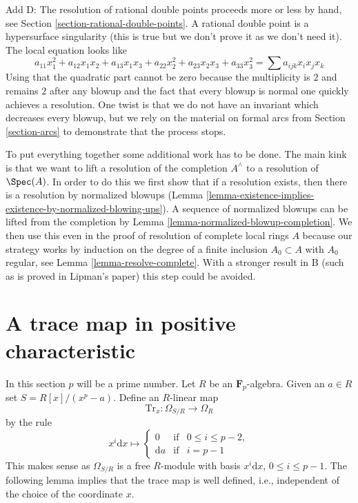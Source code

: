 \medskip\noindent
Add D: The resolution of rational double points proceeds more or
less by hand, see
Section \ref{section-rational-double-points}.
A rational double point
is a hypersurface singularity (this is true but we don't prove it
as we don't need it). The local equation looks like
$$
a_{11} x_1^2 + a_{12} x_1x_2 + a_{13}x_1x_3 + a_{22} x_2^2 +
a_{23} x_2x_3 + a_{33} x_3^2 =
\sum a_{ijk} x_ix_jx_k
$$
Using that the quadratic part cannot be zero because the multiplicity
is $2$ and remains $2$ after any blowup and the fact that every blowup
is normal one quickly achieves a resolution. One twist is that we
do not have an invariant which decreases every blowup, but we rely
on the material on formal arcs from Section \ref{section-arcs}
to demonstrate that the process stops.

\medskip\noindent
To put everything together some additional work has
to be done. The main kink is that we want to lift a resolution
of the completion $A^\wedge$ to a resolution of $\Spec(A)$.
In order to do this we first show that if a resolution exists,
then there is a resolution by normalized blowups
(Lemma \ref{lemma-existence-implies-existence-by-normalized-blowing-ups}).
A sequence of normalized blowups can be lifted from the completion
by Lemma \ref{lemma-normalized-blowup-completion}.
We then use this even in the proof of resolution of complete
local rings $A$ because our strategy works by induction
on the degree of a finite inclusion $A_0 \subset A$ with
$A_0$ regular, see Lemma \ref{lemma-resolve-complete}.
With a stronger result in B (such as is proved in Lipman's paper)
this step could be avoided.




\section{A trace map in positive characteristic}
\label{section-trace}

\noindent
In this section $p$ will be a prime number. Let $R$ be an
$\mathbf{F}_p$-algebra. Given an $a \in R$ set $S = R[x]/(x^p - a)$.
Define an $R$-linear map
$$
\text{Tr}_x : \Omega_{S/R} \longrightarrow \Omega_R
$$
by the rule
$$
x^i\text{d}x \longmapsto
\left\{
\begin{matrix}
0 & \text{if} & 0 \leq i \leq p - 2, \\
\text{d}a & \text{if} & i = p - 1
\end{matrix}
\right.
$$
This makes sense as $\Omega_{S/R}$ is a free $R$-module with
basis $x^i\text{d}x$, $0 \leq i \leq p - 1$.
The following lemma implies that the trace map is well defined,
i.e., independent of the choice of the coordinate $x$.

